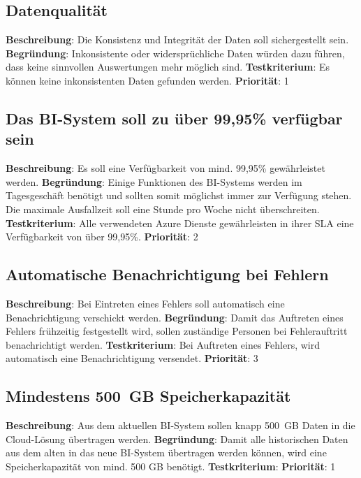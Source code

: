 \subsection{Datenqualität} \label{sec:anforderungsspezifikation:Datenkonsistenz}
\textbf{Beschreibung}: Die Konsistenz und Integrität der Daten soll sichergestellt sein.
\newline \textbf{Begründung}: Inkonsistente oder widersprüchliche Daten würden dazu führen, dass keine sinnvollen Auswertungen mehr möglich sind.
\newline \textbf{Testkriterium}: Es können keine inkonsistenten Daten gefunden werden.
\newline \textbf{Priorität}: 1

\subsection{Das BI-System soll zu über 99,95\% verfügbar sein} \label{sec:anforderungsspezifikation:verfügbarkeit}
\textbf{Beschreibung}:  Es soll eine Verfügbarkeit von mind. 99,95\% gewährleistet werden. 
\newline \textbf{Begründung}: Einige Funktionen des BI-Systems werden im Tagesgeschäft benötigt und sollten somit möglichst immer zur Verfügung stehen. Die maximale Ausfallzeit soll eine Stunde pro Woche nicht überschreiten.
\newline \textbf{Testkriterium}: Alle verwendeten Azure Dienste gewährleisten in ihrer SLA eine Verfügbarkeit von über 99,95\%.
\newline \textbf{Priorität}: 2

\subsection{Automatische Benachrichtigung bei Fehlern} \label{sec:anforderungsspezifikation:AutomatischeFehlerbehandlung}
\textbf{Beschreibung}: Bei Eintreten eines Fehlers soll automatisch eine Benachrichtigung verschickt werden. 
\newline \textbf{Begründung}: Damit das Auftreten eines Fehlers frühzeitig festgestellt wird, sollen zuständige Personen bei Fehlerauftritt benachrichtigt werden.
\newline \textbf{Testkriterium}: Bei Auftreten eines Fehlers, wird automatisch eine Benachrichtigung versendet.
\newline \textbf{Priorität}: 3

\subsection{Mindestens 500 GB Speicherkapazität} \label{sec:anforderungsspezifikation:speicherkapazität}
\textbf{Beschreibung}: Aus dem aktuellen BI-System sollen knapp 500 GB Daten in die Cloud-Lösung übertragen werden.
\newline \textbf{Begründung}: Damit alle historischen Daten aus dem alten in das neue BI-System übertragen werden können, wird eine Speicherkapazität von mind. 500 GB benötigt.
\newline \textbf{Testkriterium}: 
\newline \textbf{Priorität}: 1

